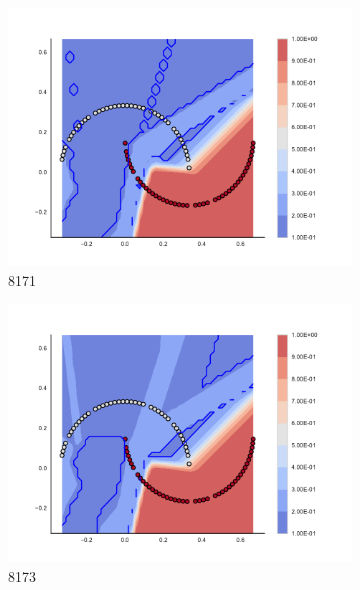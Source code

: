 \begin{figure}[h]
\begin{subfigure}[b]{0.09\textwidth}
    \includegraphics[clip, trim=2.35cm 1.75cm 4.5cm 0cm,width=\textwidth]{img/convergence/8171.pdf}
    \caption{8171}
    \label{fig:convergence_8171}
\end{subfigure}
%
\begin{subfigure}[b]{0.09\textwidth}
    \includegraphics[clip, trim=2.35cm 1.75cm 4.5cm 0cm,width=\textwidth]{img/convergence/8173.pdf}
    \caption{8173}
    \label{fig:convergence_8173}
\end{subfigure}
%
\begin{subfigure}[b]{0.09\textwidth}

\end{subfigure}
\end{figure}
